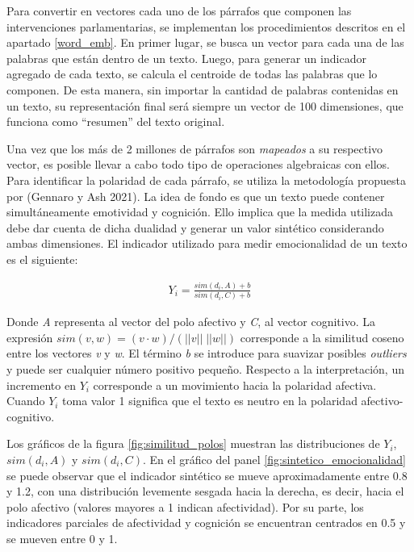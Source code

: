 \documentclass[
  12pt,
]{article}
\begin{document}
Para convertir en vectores cada uno de los párrafos que componen las
intervenciones parlamentarias, se implementan los procedimientos
descritos en el apartado \ref{word_emb}. En primer lugar, se busca un
vector para cada una de las palabras que están dentro de un texto.
Luego, para generar un indicador agregado de cada texto, se calcula el
centroide de todas las palabras que lo componen. De esta manera, sin
importar la cantidad de palabras contenidas en un texto, su
representación final será siempre un vector de 100 dimensiones, que
funciona como ``resumen'' del texto original.

Una vez que los más de 2 millones de párrafos son \emph{mapeados} a su
respectivo vector, es posible llevar a cabo todo tipo de operaciones
algebraicas con ellos. Para identificar la polaridad de cada párrafo, se
utiliza la metodología propuesta por (Gennaro y Ash 2021). La idea de
fondo es que un texto puede contener simultáneamente emotividad y
cognición. Ello implica que la medida utilizada debe dar cuenta de dicha
dualidad y generar un valor sintético considerando ambas dimensiones. El
indicador utilizado para medir emocionalidad de un texto es el
siguiente:

\begin{align}
\label{indicador_emotividad}
Y_i = \frac{sim(d_i, A) + b}{sim(d_i, C) + b} 
\end{align}

Donde \textit{A} representa al vector del polo afectivo y \textit{C}, al
vector cognitivo. La expresión
\(sim(v, w) = (v \cdot w)/(||v||\;||w||)\) corresponde a la similitud
coseno entre los vectores \textit{v} y \textit{w}. El término \textit{b}
se introduce para suavizar posibles \emph{outliers} y puede ser
cualquier número positivo pequeño. Respecto a la interpretación, un
incremento en \(Y_i\) corresponde a un movimiento hacia la polaridad
afectiva. Cuando \(Y_i\) toma valor 1 significa que el texto es neutro
en la polaridad afectivo-cognitivo.

Los gráficos de la figura \ref{fig:similitud_polos} muestran las
distribuciones de \(Y_i\), \(sim(d_i, A)\) y \(sim(d_i, C)\). En el
gráfico del panel \ref{fig:sintetico_emocionalidad} se puede observar
que el indicador sintético se mueve aproximadamente entre 0.8 y 1.2, con
una distribución levemente sesgada hacia la derecha, es decir, hacia el
polo afectivo (valores mayores a 1 indican afectividad). Por su parte,
los indicadores parciales de afectividad y cognición se encuentran
centrados en 0.5 y se mueven entre 0 y 1.
\end{document}
